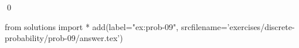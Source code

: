 
\begin{ex} 
  \label{ex:prob-09}
  
  \qed
\end{ex} 
\begin{python0}
from solutions import *
add(label="ex:prob-09",
    srcfilename='exercises/discrete-probability/prob-09/answer.tex') 
\end{python0}
